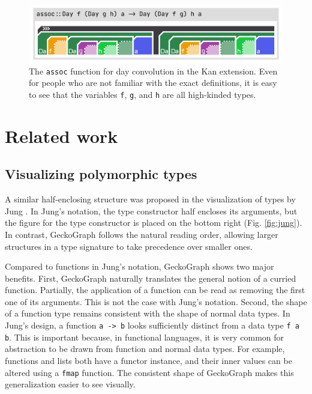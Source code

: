 \begin{figure}[hbt]
  \includegraphics[width=\linewidth]{figures/assoc}
  \caption[The \texttt{assoc} function for day convolution \cite{Day1970-kb} in the Kan extension depicted in GeckoGraph]{\label{fig:assoc} The \texttt{assoc} function for day convolution \cite{Day1970-kb} in the Kan extension. Even for people who are not familiar with the exact definitions, it is easy to see that the variables \texttt{f},  \texttt{g}, and \texttt{h} are all high-kinded types.}
\end{figure}







\section{Related work}
\subsection{Visualizing polymorphic types}
A similar half-enclosing structure was proposed in the visualization of types by Jung \cite{Jung2000-oc}. In Jung's notation, the type constructor half encloses its arguments, but the figure for the type constructor is placed on the bottom right (Fig. \ref{fig:jung}).  In contrast, GeckoGraph follows the natural reading order, allowing larger structures in a type signature to take precedence over smaller ones. 

Compared to functions in Jung's notation,  GeckoGraph shows two major benefits. First, GeckoGraph naturally translates the general notion of a curried function. Partially, the application of a function can be read as removing the first one of its arguments. This is not the case with Jung's notation. Second, the shape of a function type remains consistent with the shape of normal data types. In Jung's design, a function \texttt{a -> b} looks sufficiently distinct from a data type \texttt{f a b}. This is important because, in functional languages, it is very common for abstraction to be drawn from function and normal data types. For example,  functions and lists both have a functor instance, and their inner values can be altered using a \texttt{fmap} function. The consistent shape of GeckoGraph makes this generalization easier to see visually. 


